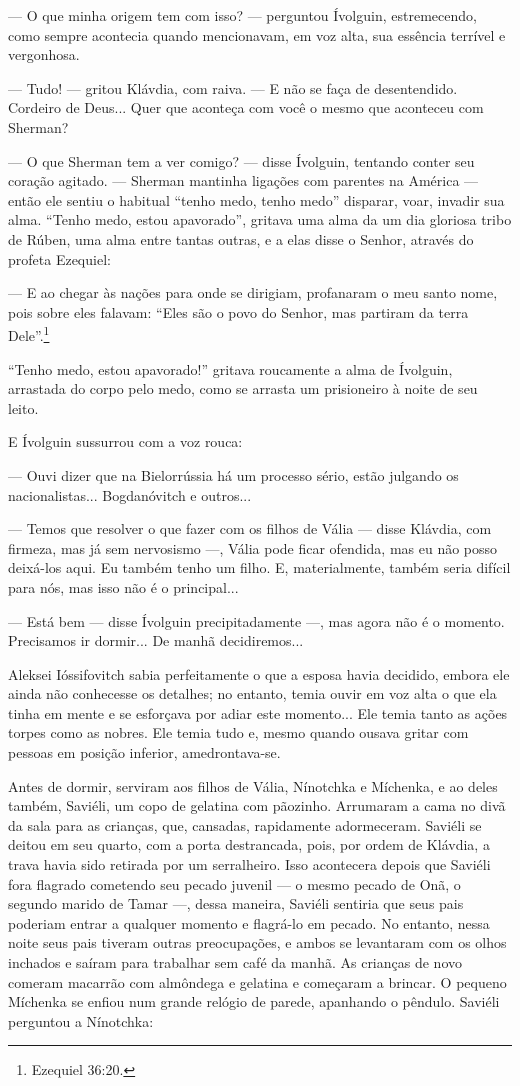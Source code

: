 --- O que minha origem tem com isso? --- perguntou Ívolguin,
estremecendo, como sempre acontecia quando mencionavam, em voz alta, sua
essência terrível e vergonhosa.

--- Tudo! --- gritou Klávdia, com raiva. --- E não se faça de
desentendido. Cordeiro de Deus... Quer que aconteça com você o mesmo que
aconteceu com Sherman?

--- O que Sherman tem a ver comigo? --- disse Ívolguin, tentando conter
seu coração agitado. --- Sherman mantinha ligações com parentes na
América --- então ele sentiu o habitual ``tenho medo, tenho medo''
disparar, voar, invadir sua alma. ``Tenho medo, estou apavorado'',
gritava uma alma da um dia gloriosa tribo de Rúben, uma alma entre
tantas outras, e a elas disse o Senhor, através do profeta Ezequiel:

--- E ao chegar às nações para onde se dirigiam, profanaram o meu santo
nome, pois sobre eles falavam: ``Eles são o povo do Senhor, mas partiram
da terra Dele''.\footnote{Ezequiel 36:20.}

``Tenho medo, estou apavorado!'' gritava roucamente a alma de Ívolguin,
arrastada do corpo pelo medo, como se arrasta um prisioneiro à noite de
seu leito.

E Ívolguin sussurrou com a voz rouca:

--- Ouvi dizer que na Bielorrússia há um processo sério, estão julgando
os nacionalistas... Bogdanóvitch e outros...

--- Temos que resolver o que fazer com os filhos de Vália --- disse
Klávdia, com firmeza, mas já sem nervosismo ---, Vália pode ficar
ofendida, mas eu não posso deixá-los aqui. Eu também tenho um filho. E,
materialmente, também seria difícil para nós, mas isso não é o
principal...

--- Está bem --- disse Ívolguin precipitadamente ---, mas agora não é o
momento. Precisamos ir dormir... De manhã decidiremos...

Aleksei Ióssifovitch sabia perfeitamente o que a esposa havia decidido,
embora ele ainda não conhecesse os detalhes; no entanto, temia ouvir em
voz alta o que ela tinha em mente e se esforçava por adiar este
momento... Ele temia tanto as ações torpes como as nobres. Ele temia
tudo e, mesmo quando ousava gritar com pessoas em posição inferior,
amedrontava-se.

Antes de dormir, serviram aos filhos de Vália, Nínotchka e Míchenka, e
ao deles também, Saviéli, um copo de gelatina com pãozinho. Arrumaram a
cama no divã da sala para as crianças, que, cansadas, rapidamente
adormeceram. Saviéli se deitou em seu quarto, com a porta destrancada,
pois, por ordem de Klávdia, a trava havia sido retirada por um
serralheiro. Isso acontecera depois que Saviéli fora flagrado cometendo
seu pecado juvenil --- o mesmo pecado de Onã, o segundo marido de Tamar
---, dessa maneira, Saviéli sentiria que seus pais poderiam entrar a
qualquer momento e flagrá-lo em pecado. No entanto, nessa noite seus
pais tiveram outras preocupações, e ambos se levantaram com os olhos
inchados e saíram para trabalhar sem café da manhã. As crianças de novo
comeram macarrão com almôndega e gelatina e começaram a brincar. O
pequeno Míchenka se enfiou num grande relógio de parede, apanhando o
pêndulo. Saviéli perguntou a Nínotchka:

